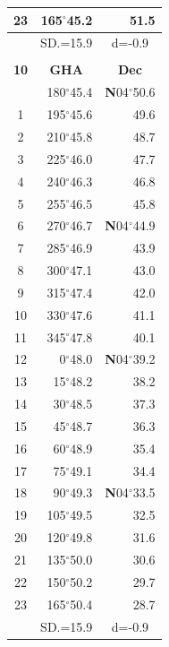 \documentclass[10pt, a4paper]{report}
\begin{document}
\begin{scriptsize}
\begin{tabular*}{0.2\textwidth}[t]{@{\extracolsep{\fill}}|c|rr|}
23 & 165$^\circ$45.2 & 51.5\\
\hline
\rule{0pt}{2.4ex} & \multicolumn{1}{c}{SD.=15.9} & \multicolumn{1}{c|}{d=-0.9}\\
\hline
\multicolumn{1}{c}{}\\[-0.5ex]\hline
\multicolumn{1}{|c|}{\rule{0pt}{2.6ex}\textbf{10}} & \multicolumn{1}{c}{\textbf{GHA}} & \multicolumn{1}{c|}{\textbf{Dec}}\\
\hline\rule{0pt}{2.6ex}\noindent
0 & 180$^\circ$45.4 & \textbf{N}04$^\circ$50.6\\
1 & 195$^\circ$45.6 & 49.6\\
2 & 210$^\circ$45.8 & 48.7\\
3 & 225$^\circ$46.0 & \raisebox{0.24ex}{\boldmath$\cdot$~\boldmath$\cdot$~~}47.7\\
4 & 240$^\circ$46.3 & 46.8\\
5 & 255$^\circ$46.5 & 45.8\\[2Pt]
6 & 270$^\circ$46.7 & \textbf{N}04$^\circ$44.9\\
7 & 285$^\circ$46.9 & 43.9\\
8 & 300$^\circ$47.1 & 43.0\\
9 & 315$^\circ$47.4 & \raisebox{0.24ex}{\boldmath$\cdot$~\boldmath$\cdot$~~}42.0\\
10 & 330$^\circ$47.6 & 41.1\\
11 & 345$^\circ$47.8 & 40.1\\[2Pt]
12 & 0$^\circ$48.0 & \textbf{N}04$^\circ$39.2\\
13 & 15$^\circ$48.2 & 38.2\\
14 & 30$^\circ$48.5 & 37.3\\
15 & 45$^\circ$48.7 & \raisebox{0.24ex}{\boldmath$\cdot$~\boldmath$\cdot$~~}36.3\\
16 & 60$^\circ$48.9 & 35.4\\
17 & 75$^\circ$49.1 & 34.4\\[2Pt]
18 & 90$^\circ$49.3 & \textbf{N}04$^\circ$33.5\\
19 & 105$^\circ$49.5 & 32.5\\
20 & 120$^\circ$49.8 & 31.6\\
21 & 135$^\circ$50.0 & \raisebox{0.24ex}{\boldmath$\cdot$~\boldmath$\cdot$~~}30.6\\
22 & 150$^\circ$50.2 & 29.7\\
23 & 165$^\circ$50.4 & 28.7\\
\hline
\rule{0pt}{2.4ex} & \multicolumn{1}{c}{SD.=15.9} & \multicolumn{1}{c|}{d=-0.9}\\
\hline
\end{tabular*}\noindent

\end{scriptsize}
\end{document}
